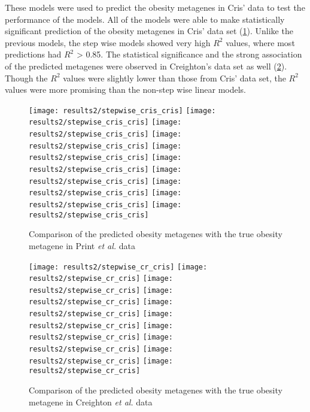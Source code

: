 These models were used to predict the obesity metagenes in Cris' data to test the performance of the models.
All of the models were able to make statistically significant prediction of the obesity metagenes in Cris' data set (\cref{fig:stepwise_cris}).
Unlike the previous models, the step wise models showed very high $R^2$ values, where most predictions had $R^2$ \textgreater{} 0.85.
The statistical significance and the strong association of the predicted metagenes were observed in Creighton's data set as well (\cref{fig:stepwise_cr}).
Though the $R^2$ values were slightly lower than those from Cris' data set, the $R^2$ values were more promising than the non-step wise linear models.

\begin{figure}[htpb]
	\centering
	\texttt{[image: results2/stepwise\_cris\_cris]}
	\texttt{[image: results2/stepwise\_cris\_cris]}
	\texttt{[image: results2/stepwise\_cris\_cris]}
	\texttt{[image: results2/stepwise\_cris\_cris]}
	\texttt{[image: results2/stepwise\_cris\_cris]}
	\texttt{[image: results2/stepwise\_cris\_cris]}
	\texttt{[image: results2/stepwise\_cris\_cris]}
	\texttt{[image: results2/stepwise\_cris\_cris]}
	\texttt{[image: results2/stepwise\_cris\_cris]}
	\texttt{[image: results2/stepwise\_cris\_cris]}
	\caption{Comparison of the predicted obesity metagenes with the true obesity metagene in Print \textit{et al.} data}
	\label{fig:stepwise_cris}
\end{figure}

\begin{figure}[htpb]
	\centering
	\texttt{[image: results2/stepwise\_cr\_cris]}
	\texttt{[image: results2/stepwise\_cr\_cris]}
	\texttt{[image: results2/stepwise\_cr\_cris]}
	\texttt{[image: results2/stepwise\_cr\_cris]}
	\texttt{[image: results2/stepwise\_cr\_cris]}
	\texttt{[image: results2/stepwise\_cr\_cris]}
	\texttt{[image: results2/stepwise\_cr\_cris]}
	\texttt{[image: results2/stepwise\_cr\_cris]}
	\texttt{[image: results2/stepwise\_cr\_cris]}
	\texttt{[image: results2/stepwise\_cr\_cris]}
	\caption{Comparison of the predicted obesity metagenes with the true obesity metagene in Creighton \textit{et al.} data}
	\label{fig:stepwise_cr}
\end{figure}

